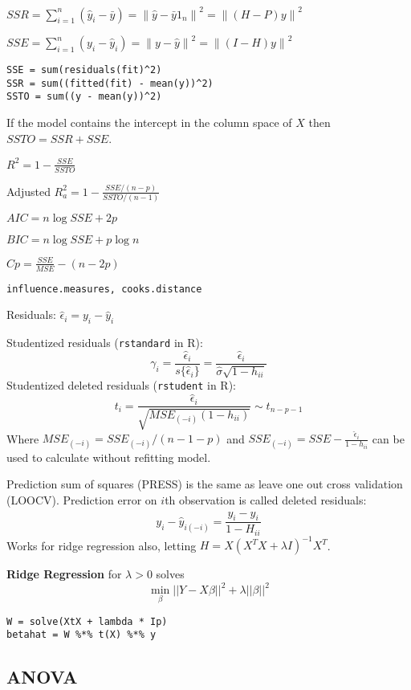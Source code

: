 \documentclass[10pt, twocolumn]{article}
\newcommand{\norm}[1]{\left\lVert#1\right\rVert}
\begin{document}
$SSR = \sum_{i=1}^n (\hat{y}_i - \bar{y}) = \norm{\hat{y} - \bar{y} 1_n}^2
    = \norm{(H - P)y}^2$

$SSE = \sum_{i=1}^n (y_i - \hat{y}_i) = \norm{y - \hat{y}}^2
        = \norm{(I - H)y}^2$

\begin{verbatim}
SSE = sum(residuals(fit)^2)
SSR = sum((fitted(fit) - mean(y))^2)
SSTO = sum((y - mean(y))^2)
\end{verbatim}

If the model contains the intercept in the column space of $X$  then $SSTO = SSR + SSE$.

$R^2 = 1 - \frac{SSE}{SSTO}$

Adjusted $R^2_a = 1 - \frac{SSE / (n-p)}{SSTO / (n-1)}$

$AIC = n \log SSE + 2p$

$BIC = n \log SSE + p \log n$

$Cp = \frac{SSE}{MSE} - (n - 2p)$

\begin{verbatim}
influence.measures, cooks.distance
\end{verbatim}

Residuals: $\hat{\epsilon}_i = y_i - \hat{y}_i$

Studentized residuals (\texttt{rstandard} in R): 
\[
    \gamma_i =
    \frac{\hat{\epsilon}_i}{ s \{ \hat{\epsilon}_i \} } = 
    \frac{\hat{\epsilon}_i}{\hat{\sigma} \sqrt{1 - h_{ii}}}
\]
Studentized deleted residuals (\texttt{rstudent} in R):  
\[
    t_i = \frac{\hat{\epsilon}_i}{\sqrt{MSE_{(-i)} (1 - h_{ii})}} \sim t_{n - p -1}
\]
Where $MSE_{(-i)} = SSE_{(-i)} / (n - 1 - p)$ and
$SSE_{(-i)} = SSE - \frac{\hat{\epsilon}_i}{1 - h_{ii}}$ can be used to
calculate without refitting model.

Prediction sum of squares (PRESS) is the same as leave one out cross
validation (LOOCV). Prediction error on $i$th observation is called deleted
residuals:
\[
    y_i - \hat{y}_{i (-i)} = \frac{y_i - \hat{y}_i}{1 - H_{ii}}
\]
Works for ridge regression also, letting 
$H = X(X^T X + \lambda I)^{-1} X^T$.

\textbf{Ridge Regression} for $\lambda > 0$ solves
\[
    \min_\beta ||Y - X\beta||^2 + \lambda ||\beta||^2
\]
\begin{verbatim}
W = solve(XtX + lambda * Ip)
betahat = W %*% t(X) %*% y
\end{verbatim}


\subsection*{ANOVA}
\end{document}

